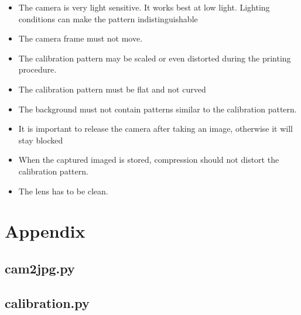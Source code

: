 \documentclass{scrartcl}
\begin{document}
\begin{itemize}
\item The camera is very light sensitive. It works best at low light. Lighting conditions can make the pattern indistinguishable
\item The camera frame must not move.
\item The calibration pattern may be scaled or even distorted during the printing procedure.
\item The calibration pattern must be flat and not curved
\item The background must not contain patterns similar to the calibration pattern.
\item It is important to release the camera after taking an image, otherwise it will stay blocked
\item When the captured imaged is stored, compression should not distort the calibration pattern.
\item The lens has to be clean.
\end{itemize}







\section{Appendix}

\subsection{cam2jpg.py}



\subsection{calibration.py}






\end{document}

